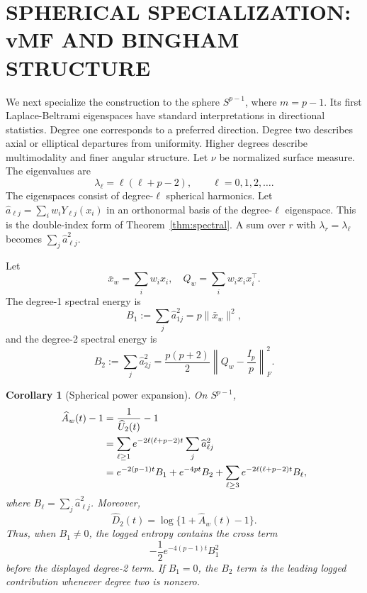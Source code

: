 \documentclass[twoside]{article}
\newtheorem{corollary}[theorem]{Corollary}
\theoremstyle{definition}
\theoremstyle{remark}
\begin{document}
\section{SPHERICAL SPECIALIZATION: vMF AND BINGHAM STRUCTURE}\label{sec:spheres}


We next specialize the construction to the sphere $S^{p-1}$, where $m=p-1$. Its first Laplace-Beltrami eigenspaces have standard interpretations in directional statistics. Degree one corresponds to a preferred direction. Degree two describes axial or elliptical departures from uniformity. Higher degrees describe multimodality and finer angular structure. Let $\nu$ be normalized surface measure. The eigenvalues are
\begin{equation*}
  \lambda_\ell=\ell(\ell+p-2),\qquad \ell=0,1,2,\ldots.
\end{equation*}
The eigenspaces consist of degree-$\ell$ spherical harmonics. Let $\widehat a_{\ell j}=\sum_iw_iY_{\ell j}(x_i)$ in an orthonormal basis of the degree-$\ell$ eigenspace. This is the double-index form of Theorem~\ref{thm:spectral}. A sum over $r$ with $\lambda_r=\lambda_\ell$ becomes $\sum_j\widehat a_{\ell j}^2$.

Let
\begin{equation*}
  \bar x_w=\sum_iw_ix_i,
  \quad
  Q_w=\sum_iw_ix_ix_i^\top.
\end{equation*}
The degree-1 spectral energy is
\begin{equation}
  B_1:=\sum_j\widehat a_{1j}^2=p\|\bar x_w\|^2,
  \label{eq:B1}
\end{equation}
and the degree-2 spectral energy is
\begin{equation}
  B_2:=\sum_j\widehat a_{2j}^2=\frac{p(p+2)}{2}\left\|Q_w-\frac{I_p}{p}\right\|_F^2.
  \label{eq:B2}
\end{equation}

\begin{corollary}[Spherical power expansion]
\label{cor:sphere}
On $S^{p-1}$,
\begin{align*}
  \widehat A_w(t)-1
  &=\frac{1}{\widehat U_2(t)}-1 \notag\\
  &=\sum_{\ell\ge1}e^{-2\ell(\ell+p-2)t}\sum_j\widehat a_{\ell j}^2 \notag\\
  &=e^{-2(p-1)t}B_1+e^{-4pt}B_2+
  \sum_{\ell\ge3}e^{-2\ell(\ell+p-2)t}B_\ell,
\end{align*}
where $B_\ell=\sum_j\widehat a_{\ell j}^2$.
Moreover,
\begin{equation*}
  \widehat D_2(t)=\log\{1+\widehat A_w(t)-1\}.
\end{equation*}
Thus, when $B_1\ne0$, the logged entropy contains the cross term
\begin{equation*}
  -\frac12e^{-4(p-1)t}B_1^2
\end{equation*}
before the displayed degree-2 term. If $B_1=0$, the $B_2$ term is the leading logged contribution whenever degree two is nonzero.
\end{corollary}
\end{document}
